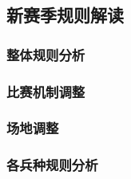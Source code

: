 \subsection{新赛季规则解读}

    \subsubsection{整体规则分析}

    \subsubsection{比赛机制调整}

    \subsubsection{场地调整}

    \subsubsection{各兵种规则分析}
